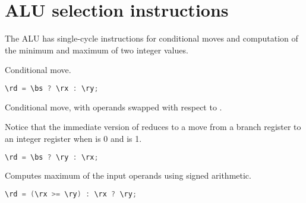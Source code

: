 
\section{ALU selection instructions}


The \rvex{} ALU has single-cycle instructions for conditional moves and
computation of the minimum and maximum of two integer values.

Conditional move.

\begin{lstlisting}[numbers=none, basicstyle=\ttfamily\footnotesize, language=C++]
\rd = \bs ? \rx : \ry;
\end{lstlisting}

Conditional move, with operands swapped with respect to .

Notice that the immediate version of  reduces to a move from a
branch register to an integer register when  is 0 and  is 1.

\begin{lstlisting}[numbers=none, basicstyle=\ttfamily\footnotesize, language=C++]
\rd = \bs ? \ry : \rx;
\end{lstlisting}

Computes maximum of the input operands using signed arithmetic.

\begin{lstlisting}[numbers=none, basicstyle=\ttfamily\footnotesize, language=C++]
\rd = (\rx >= \ry) : \rx ? \ry;
\end{lstlisting}

